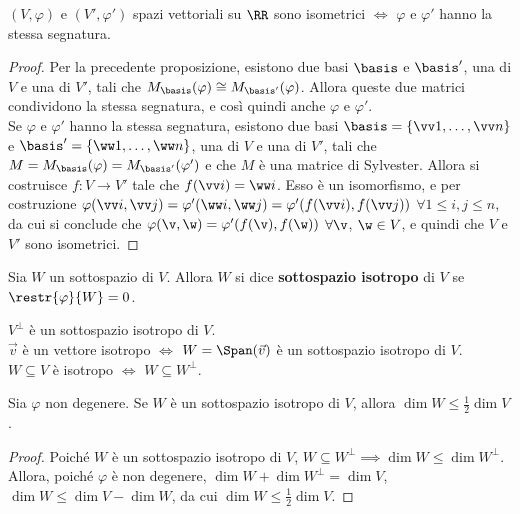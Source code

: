 \documentclass[11pt]{article}
\begin{document}
	\begin{proposition} $(V, \varphi)$ e $(V', \varphi')$ spazi vettoriali
		su $\RR$ sono
		isometrici $\iff$ $\varphi$ e $\varphi'$ hanno la stessa segnatura.
	\end{proposition}

	\begin{proof}\nl\nl
		\rightproof Per la precedente proposizione, esistono due basi $\basis$ e $\basis'$, una di $V$ e una di $V'$,
		tali che $M_\basis(\varphi) \cong M_{\basis'}(\varphi)$. Allora queste due matrici condividono la stessa
		segnatura, e così quindi anche $\varphi$ e $\varphi'$. \\

		\leftproof Se $\varphi$ e $\varphi'$ hanno la stessa segnatura, esistono due basi $\basis = \{ \vv 1, \ldots, \vv n \}$ e $\basis' = \{ \ww 1, \ldots, \ww n \}$, una
		di $V$ e una di $V'$, tali che $M = M_\basis(\varphi) = M_{\basis'}(\varphi')$ e che $M$ è una matrice di
		Sylvester. Allora si costruisce $f : V \to V'$ tale che $f(\vv i) = \ww i$. Esso è un isomorfismo, e per
		costruzione $\varphi(\vv i, \vv j) = \varphi'(\ww i, \ww j) = \varphi'(f(\vv i), f(\vv j))$ $\forall 1 \leq i, j \leq n$, da cui
		si conclude che $\varphi(\v, \w) = \varphi'(f(\v), f(\w))$ $\forall \v$, $\w \in V$, e quindi che $V$ e
		$V'$ sono isometrici.
	\end{proof}

	\begin{definition}
		Sia $W$ un sottospazio di $V$. Allora $W$ si dice \textbf{sottospazio isotropo} di $V$
		se $\restr{\varphi}{W} = 0$.
	\end{definition}

	\begin{remark}\nl
		\li $V^\perp$ è un sottospazio isotropo di $V$. \\
		\li $\vec{v}$ è un vettore isotropo $\iff$ $W = \Span(\vec v)$ è un sottospazio isotropo di $V$. \\
		\li $W \subseteq V$ è isotropo $\iff$ $W \subseteq W^\perp$.
	\end{remark}

	\begin{proposition}
		Sia $\varphi$ non degenere. Se $W$ è un sottospazio isotropo di $V$, allora
		$\dim W \leq \frac{1}{2} \dim V$.
	\end{proposition}

	\begin{proof}
		Poiché $W$ è un sottospazio isotropo di $V$, $W \subseteq W^\perp \implies \dim W \leq \dim W^\perp$.
		Allora, poiché $\varphi$ è non degenere, $\dim W + \dim W^\perp = \dim V$, $\dim W \leq \dim V - \dim W$,
		da cui $\dim W \leq \frac{1}{2} \dim V$.
	\end{proof}
\end{document}
